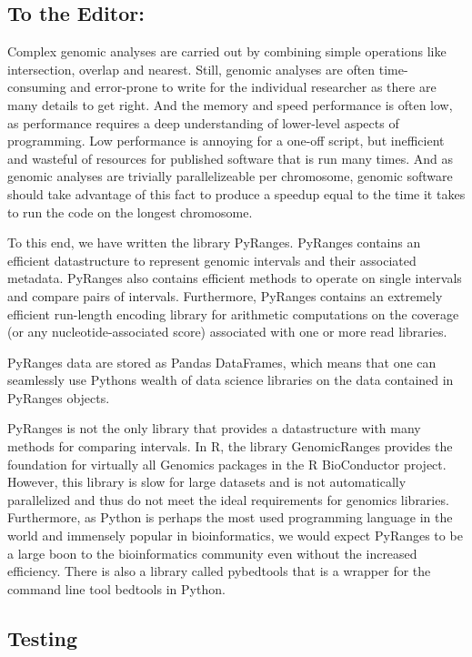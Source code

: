 \documentclass[10pt,letterpaper]{article}
\begin{document}
\subsection*{To the Editor:} Complex genomic analyses are carried out by
combining simple operations like intersection, overlap and nearest. Still,
genomic analyses are often time-consuming and error-prone to write for the
individual researcher as there are many details to get right. And the memory and
speed performance is often low, as performance requires a deep understanding of
lower-level aspects of programming. Low performance is annoying for a one-off
script, but inefficient and wasteful of resources for published software that is
run many times. And as genomic analyses are trivially parallelizeable per
chromosome, genomic software should take advantage of this fact to produce a
speedup equal to the time it takes to run the code on the longest chromosome.

To this end, we have written the library PyRanges. PyRanges contains an
efficient datastructure to represent genomic intervals and their associated
metadata. PyRanges also contains efficient methods to operate on single
intervals and compare pairs of intervals. Furthermore, PyRanges contains an
extremely efficient run-length encoding library for arithmetic computations on
the coverage (or any nucleotide-associated score) associated with one or more
read libraries.

PyRanges data are stored as Pandas DataFrames, which means that one can
seamlessly use Pythons wealth of data science libraries on the data contained in
PyRanges objects.

PyRanges is not the only library that provides a datastructure with many methods
for comparing intervals. In R, the library GenomicRanges provides the foundation
for virtually all Genomics packages in the R BioConductor project. However, this
library is slow for large datasets and is not automatically parallelized and
thus do not meet the ideal requirements for genomics libraries. Furthermore, as
Python is perhaps the most used programming language in the world and immensely
popular in bioinformatics, we would expect PyRanges to be a large boon to the
bioinformatics community even without the increased efficiency. There is also a
library called pybedtools that is a wrapper for the command line tool bedtools
in Python.

\subsection{Testing}
\end{document}
